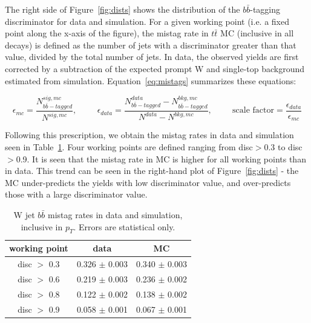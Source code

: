 The right side of Figure~\ref{fig:dists} shows the distribution of the $b\bar{b}$-tagging discriminator for data and simulation. For a given working point (i.e. a fixed point along the x-axis of the figure), the mistag rate in  $t\bar{t}$ MC (inclusive in all decays) is defined as the number of jets with a discriminator greater than that value, divided by the total number of jets. In data, the observed yields are first corrected by a subtraction of the expected prompt W and single-top background estimated from simulation. Equation~\ref{eq:mistags} summarizes these equations:

\begin{equation}
\label{eq:mistags}
\epsilon_{mc} = \frac{ N_{b\bar{b}-tagged}^{sig, mc} } { N^{sig, mc} }, \hspace{1cm}
\epsilon_{data} = \frac{N_{b\bar{b}-tagged}^{data}-N_{b\bar{b}-tagged}^{bkg, mc}}{N^{data} - N^{bkg, mc}}, \hspace{1cm}
\textrm{scale factor} = \frac{\epsilon_{data}} {\epsilon_{mc}}
\end{equation}

Following this prescription, we obtain the mistag rates in data and simulation seen in Table~\ref{tab:mistag}. Four working points are defined ranging from disc$>$0.3 to disc$>$0.9. It is seen that the mistag rate in MC is higher for all working points than in data. This trend can be seen in the right-hand plot of Figure~\ref{fig:dists} - the MC under-predicts the yields with low discriminator value, and over-predicts those with a large discriminator value.

\begin{table}[hbp!]
\centering
\caption{W jet $b\bar{b}$ mistag rates in data and simulation, inclusive in $p_{T}$. Errors are statistical only.}
\label{tab:mistag}
\begin{tabular}{c|cc}
\hline\hline
working point & data & MC\\
\hline
disc $>$ 0.3 & 0.326 $\pm$ 0.003 & 0.340 $\pm$ 0.003 \\
disc $>$ 0.6 & 0.219 $\pm$ 0.003 & 0.236 $\pm$ 0.002 \\
disc $>$ 0.8 & 0.122 $\pm$ 0.002 & 0.138 $\pm$ 0.002 \\
disc $>$ 0.9 & 0.058 $\pm$ 0.001 & 0.067 $\pm$ 0.001 \\
\hline\hline
\end{tabular}
\end{table}

